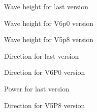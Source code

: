 \begin{figure} [!h]
\centering
{}
 \caption{Wave height for last version}
\label{figcalaishm0}
\end{figure}
\begin{figure} [!h]
\centering
{}
 \caption{Wave height for V6p0 version}
\label{figcalaishm0v6p0}
\end{figure}
\begin{figure} [!h]
\centering
{}
 \caption{Wave height for V5p8 version}
\label{figcalaishm0v5p8}
\end{figure}
\begin{figure} [!h]
\centering
{}
 \caption{Direction for last version}
\label{figcalaisdirection}
\end{figure}
\begin{figure} [!h]
\centering
{}
 \caption{Direction for V6P0  version}
\label{figcalaishm0}
\end{figure}
\begin{figure} [!h]
\centering
{}
 \caption{Power for last version}
\label{figcalaishm0}
\end{figure}
\begin{figure} [!h]
\centering
{}
 \caption{Direction for V5P8 version}
\label{figcalaishm0}
\end{figure}
